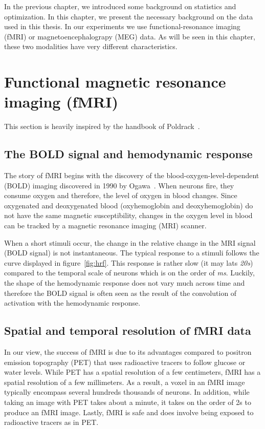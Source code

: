 In the previous chapter, we introduced some background on statistics and
optimization.
In this chapter, we present the necessary background on the data used in this
thesis.
In our experiments we use functional-resonance imaging (fMRI) or
magnetoencephalograpy (MEG) data. As will be seen in this chapter, these two modalities have very different
characteristics.

\section{Functional magnetic resonance imaging (fMRI)}
This section is heavily inspired by the handbook of
Poldrack~\cite{poldrack2011handbook}.

\subsection{The BOLD signal and hemodynamic response}
The story of fMRI begins with the discovery of the blood-oxygen-level-dependent
(BOLD) imaging discovered in 1990 by Ogawa~\cite{ogawa1990brain}. When neurons
fire, they consume oxygen and therefore, the level of oxygen in blood changes.
Since oxygenated and deoxygenated blood (oxyhemoglobin
and deoxyhemoglobin) do not have the same magnetic susceptibility, changes in
the oxygen level in blood can be tracked by a magnetic resonance imaging (MRI) scanner.

When a short stimuli occur, the change in the relative change in the MRI signal (BOLD
signal) is not instantaneous. The typical response to a stimuli follows the
curve displayed in figure~\ref{fig:hrf}. This response is rather slow (it may lats \emph{20s}) compared to the temporal scale of neurons which is on the order of \emph{ms}.
Luckily, the shape of the hemodynamic response does not vary much across time
and therefore the BOLD signal is often seen as the result of the convolution of activation with the hemodynamic response.

\subsection{Spatial and temporal resolution of fMRI data}
In our view, the success of fMRI is due to its advantages compared to positron
emission topography (PET) that uses radioactive tracers to follow glucose or water levels.
While PET has a spatial resolution of a few
centimeters, fMRI has a spatial resolution of a few millimeters. As a result, a voxel in an fMRI image typically encompass several hundreds thousands of neurons.
In addition, while taking an image with PET takes about a minute, it takes on the order of 2s to produce an fMRI image.
Lastly, fMRI is safe and does involve being exposed to radioactive tracers as in PET.

